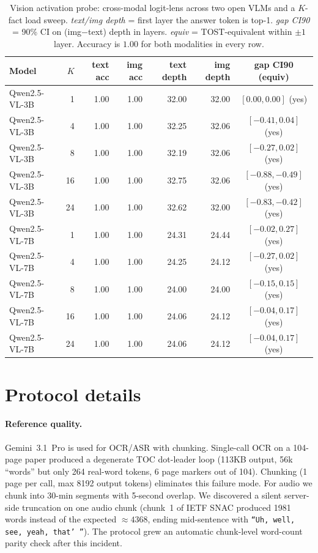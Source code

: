 \documentclass[11pt]{article}
\begin{document}
\begin{table}[h]
\centering
\small
\caption{Vision activation probe: cross-modal logit-lens across two open VLMs and a $K$-fact load sweep. \emph{text/img depth} = first layer the answer token is top-1. \emph{gap CI90} = 90\% CI on (img$-$text) depth in layers. \emph{equiv} = TOST-equivalent within $\pm 1$ layer. Accuracy is $1.00$ for both modalities in every row.}
\label{tab:vision_ladder_appdx}
\begin{tabular}{lrrrrrc}
\toprule
Model & $K$ & text acc & img acc & text depth & img depth & gap CI90 (equiv) \\
\midrule
Qwen2.5-VL-3B & 1  & 1.00 & 1.00 & 32.00 & 32.00 & $[0.00,0.00]$ (yes) \\
Qwen2.5-VL-3B & 4  & 1.00 & 1.00 & 32.25 & 32.06 & $[-0.41,0.04]$ (yes) \\
Qwen2.5-VL-3B & 8  & 1.00 & 1.00 & 32.19 & 32.06 & $[-0.27,0.02]$ (yes) \\
Qwen2.5-VL-3B & 16 & 1.00 & 1.00 & 32.75 & 32.06 & $[-0.88,-0.49]$ (yes) \\
Qwen2.5-VL-3B & 24 & 1.00 & 1.00 & 32.62 & 32.00 & $[-0.83,-0.42]$ (yes) \\
\midrule
Qwen2.5-VL-7B & 1  & 1.00 & 1.00 & 24.31 & 24.44 & $[-0.02,0.27]$ (yes) \\
Qwen2.5-VL-7B & 4  & 1.00 & 1.00 & 24.25 & 24.12 & $[-0.27,0.02]$ (yes) \\
Qwen2.5-VL-7B & 8  & 1.00 & 1.00 & 24.00 & 24.00 & $[-0.15,0.15]$ (yes) \\
Qwen2.5-VL-7B & 16 & 1.00 & 1.00 & 24.06 & 24.12 & $[-0.04,0.17]$ (yes) \\
Qwen2.5-VL-7B & 24 & 1.00 & 1.00 & 24.06 & 24.12 & $[-0.04,0.17]$ (yes) \\
\bottomrule
\end{tabular}
\end{table}

\section{Protocol details}
\label{appdx:protocol}

\paragraph{Reference quality.} Gemini~3.1~Pro is used for OCR/ASR with chunking. Single-call OCR on a 104-page paper produced a degenerate TOC dot-leader loop (113KB output, 56k ``words'' but only 264 real-word tokens, 6 page markers out of 104). Chunking (1 page per call, max 8192 output tokens) eliminates this failure mode. For audio we chunk into 30-min segments with 5-second overlap. We discovered a silent server-side truncation on one audio chunk (chunk~1 of IETF SNAC produced 1981 words instead of the expected $\approx 4368$, ending mid-sentence with \texttt{``Uh, well, see, yeah, that'\,''}). The protocol grew an automatic chunk-level word-count parity check after this incident.
\end{document}
